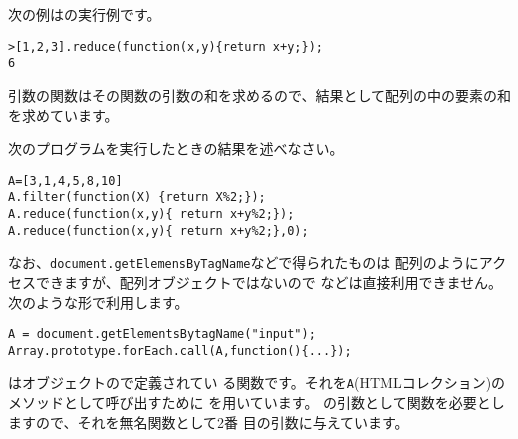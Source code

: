 次の例はの実行例です。
\begin{Verbatim}
>[1,2,3].reduce(function(x,y){return x+y;});
6
\end{Verbatim}
引数の関数はその関数の引数の和を求めるので、結果として配列の中の要素の和
を求めています。
\begin{Problem}\upshape
 次のプログラムを実行したときの結果を述べなさい。
\begin{Verbatim}
A=[3,1,4,5,8,10]
A.filter(function(X) {return X%2;});
A.reduce(function(x,y){ return x+y%2;});
A.reduce(function(x,y){ return x+y%2;},0);
\end{Verbatim}
\end{Problem}
\iffalse
\ref{argumentsSum}で\ElmJ{arguments}の総和をとる関数を作成しています。
この部分を\ElmJA{reduce}で置き換えるとうまくいきません。
\begin{Verbatim}
>function sum() {return arguments.reduce(function(x,y){return x+y;})}
undefined
>sum(1,2,3);
VM510:2 Uncaught TypeError: arguments.reduce is not a function(…)
\end{Verbatim}
「\ElmJ{arguments}には\ElmJA{reduce}という関数がない」というメッセージが
表示されています。これからも、\ElmJ{arguments}は配列のようなものだけれど
も配列とは違うことがわかります。

これを解決するにはオブジェクトのメソッドとして関数を呼び出す\ElmJ{call}
を使用します。
\begin{Verbatim}
>function sum(){return Array.prototype.reduce.call(arguments,function(x,y){return x+y;})}
undefined
>sum(1,2,3);
6
\end{Verbatim}
\ElmJA{reduce}は\ElmJ{Array}オブジェクトの\ElmJ{prototype}で定義されてい
る関数です。それを\ElmJ{arguments}のメソッドとして呼び出すために
\ElmJ{call}を用いています。
\ElmJ{reduce}の引数として関数を必要としますので、それを無名関数として2番
目の引数に与えています。

\verb+document.getElemensByTagName+などで得られた
配列のようなものに対して\ElmJA{forEach}などを利用したい場合にもこの手法
が利用できます。
\else
なお、\verb+document.getElemensByTagName+などで得られたものは
配列のようにアクセスできますが、配列オブジェクトではないので
などは直接利用できません。次のような形で利用します。

\begin{Verbatim}
A = document.getElementsBytagName("input");
Array.prototype.forEach.call(A,function(){...});
\end{Verbatim}
はオブジェクトので定義されてい
る関数です。それを\texttt{A}(HTMLコレクション)のメソッドとして呼び出すために
を用いています。
の引数として関数を必要としますので、それを無名関数として2番
目の引数に与えています。
\fi

